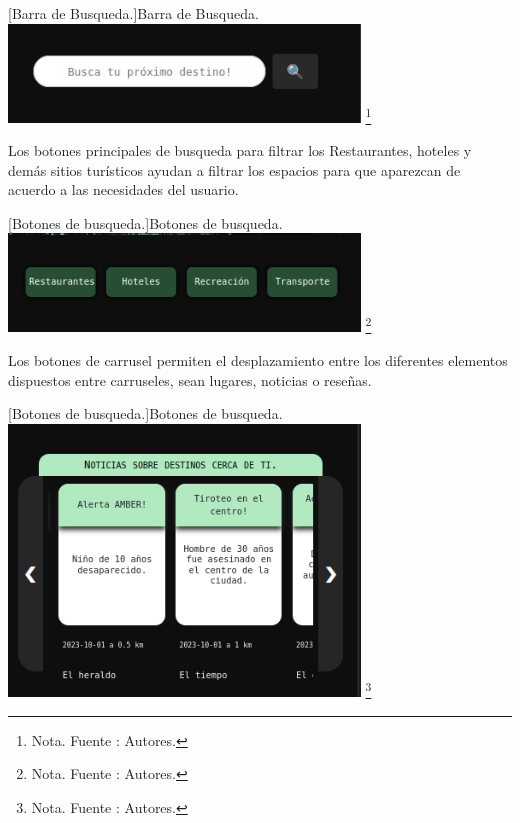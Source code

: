      \vspace{2mm}
    \begin{minipage}{0.9\textwidth}
    \centering
    [{Barra de Busqueda.}]{Barra de Busqueda.}
    \label{ManualBarraNavegacion}
    \includegraphics[width=0.7\textwidth]{Content/Images/ManualBarraBusqueda.png}
    \footnote{Nota. \textup{Fuente : Autores.}}
    \end{minipage}


    Los botones principales de busqueda para filtrar los Restaurantes, hoteles y demás sitios turísticos ayudan a filtrar los espacios para que aparezcan de acuerdo a las necesidades del usuario.

      \vspace{2mm}
    \begin{minipage}{0.9\textwidth}
    \centering
    [{Botones de busqueda.}]{Botones de busqueda.}
    \label{ManualBarraNavegacion}
    \includegraphics[width=0.7\textwidth]{Content/Images/ManualBotonesDeBusqueda.png}
    \footnote{Nota. \textup{Fuente : Autores.}}
    \end{minipage}

    Los botones de carrusel permiten el desplazamiento entre los diferentes elementos dispuestos entre carruseles, sean lugares, noticias o reseñas.

      \vspace{2mm}
    \begin{minipage}{0.9\textwidth}
    \centering
    [{Botones de busqueda.}]{Botones de busqueda.}
    \label{ManualBarraNavegacion}
    \includegraphics[width=0.7\textwidth]{Content/Images/ManualFlechasCarrusel.png}
    \footnote{Nota. \textup{Fuente : Autores.}}
    \end{minipage}

    
